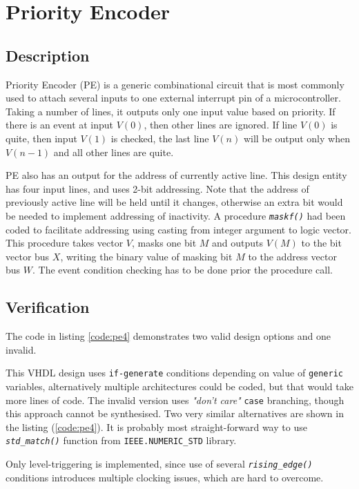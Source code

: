 \documentclass[10pt,a4paper]{report}
\begin{document}
\pagebreak
\section{Priority Encoder}
\subsection{Description}

 Priority Encoder (PE) is a generic combinational
 circuit that is most commonly used to attach
 several inputs to one external interrupt pin of
 a microcontroller. Taking a number of lines, it
 outputs only one input value based on priority.
 If there is an event at input $V(0)$, then other
 lines are ignored. If line $V(0)$ is quite,
 then input $V(1)$ is checked, the last line
 $V(n)$ will be output only when $V(n-1)$ and all
 other lines are quite.

 PE also has an output for the address of currently
 active line. This design entity has four input
 lines, and uses 2-bit addressing. Note that the
 address of previously active line will be held
 until it changes, otherwise an extra bit would
 be needed to implement addressing of inactivity.
 A procedure \emph{\texttt{maskf()}} had been
 coded to facilitate addressing using casting
 from integer argument to logic vector.
 This procedure takes vector $V$, masks one bit
 $M$ and outputs $V(M)$ to the bit vector bus $X$,
 writing the binary value of masking bit $M$ to the
 address vector bus $W$. The event condition checking
 has to be done prior the procedure call.


\subsection{Verification}

 The code in listing \ref{code:pe4} demonstrates
 two valid design options and one invalid.

 This VHDL design uses \texttt{if-generate} conditions
 depending on value of \texttt{generic} variables,
 alternatively multiple architectures could be
 coded, but that would take more lines of code.
 The invalid version uses \emph{"don't care"}
 \texttt{case} branching, though this approach
 cannot be synthesised.
 Two very similar alternatives are shown in
 the listing (\ref{code:pe4}).
 It is probably most straight-forward way to
 use \emph{\texttt{std\_match()}} function from
 \texttt{IEEE.NUMERIC\_STD} library.
 
 Only level-triggering is implemented, since
 use of several \emph{\texttt{rising\_edge()}}
 conditions introduces multiple clocking issues,
 which are hard to overcome.
\end{document}

